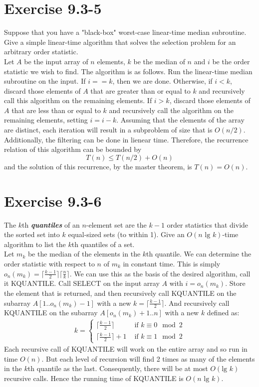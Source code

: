 \documentclass[10pt,a4paper]{article}
\begin{document}
\section*{Exercise 9.3-5}
Suppose that you have a "black-box" worst-case linear-time median subroutine. Give a simple linear-time algorithm that solves the selection problem for an arbitrary order statistic.
\vspace*{\baselineskip}
\\
Let $A$ be the input array of $n$ elements, $k$ be the median of $n$ and $i$ be the order statistic we wish to find. The algorithm is as follows. Run the linear-time median subroutine on the input. If $i==k$, then we are done. Otherwise, if $i<k$, discard those elements of $A$ that are greater than or equal to $k$ and recursively call this algorithm on the remaining elements. If $i>k$, discard those elements of $A$ that are less than or equal to $k$ and recursively call the algorithm on the remaining elements, setting $i=i-k$. Assuming that the elements of the array are distinct, each iteration will result in a subproblem of size that is $O(n/2)$. Additionally, the filtering can be done in lienear time. Therefore, the recurrence relation of this algorithm can be bounded by
\begin{equation}
T(n) \leq T(n/2) + O(n)
\end{equation}
and the solution of this recurrence, by the master theorem, is $T(n) = O(n)$.

\section*{Exercise 9.3-6}
The $k$th \textbf{\textit{quantiles}} of an $n$-element set are the $k-1$ order statistics that divide the sorted set into $k$ equal-sized sets (to within 1). Give an $O(n\text{ lg } k)$-time algorithm to list the $k$th quantiles of a set.
\vspace*{\baselineskip}
\\
Let $m_k$ be the median of the elements in the $k$th quantile. We can determine the order statistic with respect to $n$ of $m_k$ in constant time. This is simply $o_n(m_k)=\lceil\frac{k-1}{2}\rceil\lceil\frac{n}{k}\rceil$. We can use this as the basis of the desired algorithm, call it KQUANTILE. Call SELECT on the input array $A$ with $i=o_n(m_k)$. Store the element that is returned, and then recursively call KQUANTILE on the subarray $A[1..o_n(m_k)-1]$ with a new $k=\lceil\frac{k-1}{2}\rceil$. And recursively call KQUANTILE on the subarray $A[o_n(m_k)+1..n]$ with a new $k$ defined as:
\begin{align*}
	k=\begin{cases}
		\lceil\frac{k-1}{2}\rceil & \text{ if } k \equiv 0 \mod 2 \\
		\lceil\frac{k-1}{2}\rceil + 1 & \text{ if } k \equiv 1 \mod 2
	\end{cases}
\end{align*}
Each recursive call of KQUANTILE will work on the entire array and so run in time $O(n)$. But each level of recursion will find 2 times as many of the elements in the $k$th quantile as the last. Consequently, there will be at most $O(\text{lg }k)$ recursive calls. Hence the running time of KQUANTILE is $O(n\text{ lg }k)$.
\end{document}
